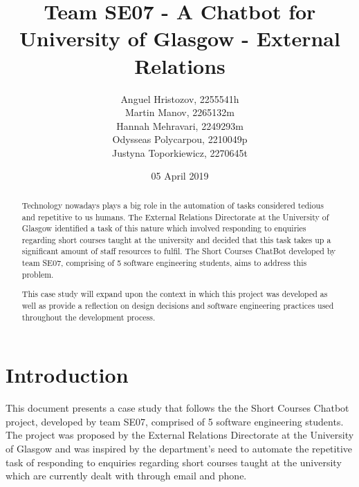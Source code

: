 \documentclass{l3proj}
\begin{document}
\title{Team SE07 - A Chatbot for University of Glasgow - External Relations}

\author{Anguel Hristozov, 2255541h \\
        Martin Manov, 2265132m \\
        Hannah Mehravari, 2249293m \\
        Odysseas Polycarpou, 2210049p \\
        Justyna Toporkiewicz, 2270645t}

\date{05 April 2019}

\maketitle

\begin{abstract}

Technology nowadays plays a big role in the automation of tasks considered tedious and repetitive to us humans. The External Relations Directorate at the University of Glasgow identified a task of this nature which involved responding to enquiries regarding short courses taught at the university and decided that this task takes up a significant amount of staff resources to fulfil.
The Short Courses ChatBot developed by team SE07, comprising of 5 software engineering students, aims to address this problem.

This case study will expand upon the context in which this project was developed as well as provide a reflection on design decisions and software engineering practices used throughout the development process.
 

\end{abstract}

\educationalconsent

\newpage

\section{Introduction}
\label{sec:intro}

This document presents a case study that follows the the Short Courses Chatbot project, developed by team SE07, comprised of 5 software engineering students. The project was proposed by the External Relations Directorate at the University of Glasgow and was inspired by the department's need to automate the repetitive task of responding to enquiries regarding short courses taught at the university which are currently dealt with through email and phone. 
\end{document}
